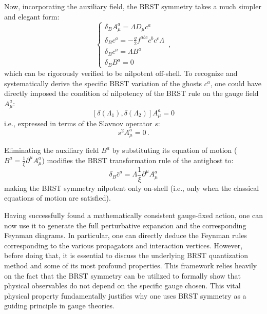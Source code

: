 Now, incorporating the auxiliary field, the BRST symmetry takes a much simpler and elegant form:
\begin{equation} \label{eq:ym_brst_transformations}
    \begin{cases}
        \delta_B A_\mu^a = \Lambda D_\mu c^a                \\
        \delta_B c^a = -\frac{g}{2} f^{abc} c^b c^c \Lambda \\
        \delta_B \bar{c}^a = \Lambda B^a                    \\
        \delta_B B^a = 0
    \end{cases} \, ,
\end{equation}
which can be rigorously verified to be nilpotent off-shell. To recognize and systematically derive the specific BRST variation of the ghosts \(c^a\), one could have directly imposed the condition of nilpotency of the BRST rule on the gauge field \(A_\mu^a\):
\[
    [\delta(\Lambda_1), \delta(\Lambda_2)] A_\mu^a = 0
\]
i.e., expressed in terms of the Slavnov operator \(s\):
\begin{equation} \label{eq:nilpotency_condition}
    s^2 A_\mu^a = 0 \, .
\end{equation}

Eliminating the auxiliary field \(B^a\) by substituting its equation of motion (\(B^a = \frac{1}{\xi} \partial^\mu A_\mu^a\)) modifies the BRST transformation rule of the antighost to:
\begin{equation} \label{eq:antighost_onshell}
    \delta_B \bar{c}^a = \Lambda \frac{1}{\xi} \partial^\mu A_\mu^a
\end{equation}
making the BRST symmetry nilpotent only on-shell (i.e., only when the classical equations of motion are satisfied).

Having successfully found a mathematically consistent gauge-fixed action, one can now use it to generate the full perturbative expansion and the corresponding Feynman diagrams. In particular, one can directly deduce the Feynman rules corresponding to the various propagators and interaction vertices. However, before doing that, it is essential to discuss the underlying BRST quantization method and some of its most profound properties. This framework relies heavily on the fact that the BRST symmetry can be utilized to formally show that physical observables do not depend on the specific gauge chosen. This vital physical property fundamentally justifies why one uses BRST symmetry as a guiding principle in gauge theories.